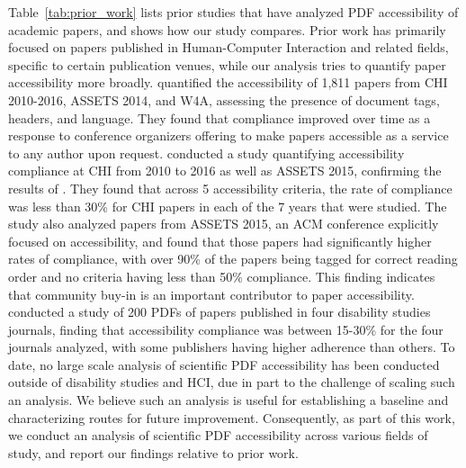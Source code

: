 Table~\ref{tab:prior_work} lists prior studies that have analyzed PDF accessibility of academic papers, and shows how our study compares. Prior work has primarily focused on papers published in Human-Computer Interaction and related fields, specific to certain publication venues, while our analysis tries to quantify paper accessibility more broadly.
\citet{Brady2015CreatingAP} quantified the accessibility of 1,811 papers from CHI 2010-2016, ASSETS 2014, and W4A, assessing the presence of document tags, headers, and language. They found that compliance improved over time as a response to conference organizers offering to make papers accessible as a service to any author upon request. \citet{Lazar2017MakingTF} conducted a study quantifying accessibility compliance at CHI from 2010 to 2016 as well as ASSETS 2015,
confirming the results of \citet{Brady2015CreatingAP}. They found that across 5 accessibility criteria, the rate of compliance was less than 30\% for CHI papers in each of the 7 years that were studied. The study also analyzed papers from ASSETS 2015, an ACM conference explicitly focused on accessibility, and found that those papers had significantly higher rates of compliance, with over 90\% of the papers being tagged for correct reading order and no criteria having less than 50\% compliance. This finding indicates that community buy-in is an important contributor to paper accessibility.
\citet{Nganji2015ThePD} conducted a study of 200 PDFs of papers published in four disability studies journals, finding that accessibility compliance was between 15-30\% for the four journals analyzed, with some publishers having higher adherence than others. To date, no large scale analysis of scientific PDF accessibility has been conducted outside of disability studies and HCI, due in part to the challenge of scaling such an analysis. We believe such an analysis is useful for establishing a baseline and characterizing routes for future improvement. Consequently, as part of this work, we conduct an analysis of scientific PDF accessibility across various fields of study, and report our findings relative to prior work. 


